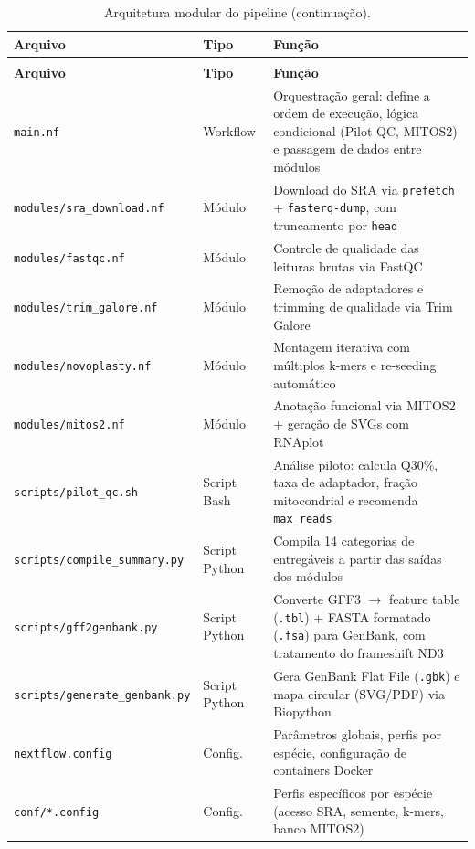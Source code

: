 \begin{longtable}{@{}p{4.5cm}p{2cm}p{7.5cm}@{}}
\caption{Arquitetura modular do pipeline: módulos, scripts e suas responsabilidades.}
\label{tab:modulos} \\
\toprule
\textbf{Arquivo} & \textbf{Tipo} & \textbf{Função} \\
\midrule
\endfirsthead
\caption[]{Arquitetura modular do pipeline (continuação).} \\
\toprule
\textbf{Arquivo} & \textbf{Tipo} & \textbf{Função} \\
\midrule
\endhead
\bottomrule
\endfoot
\texttt{main.nf} & Workflow & Orquestração geral: define a ordem de execução, lógica condicional (Pilot QC, MITOS2) e passagem de dados entre módulos \\
\addlinespace
\texttt{modules/\allowbreak sra\_download.nf} & Módulo & Download do SRA via \texttt{prefetch} + \texttt{fasterq-dump}, com truncamento por \texttt{head} \\
\addlinespace
\texttt{modules/\allowbreak fastqc.nf} & Módulo & Controle de qualidade das leituras brutas via FastQC \\
\addlinespace
\texttt{modules/\allowbreak trim\_galore.nf} & Módulo & Remoção de adaptadores e trimming de qualidade via Trim Galore \\
\addlinespace
\texttt{modules/\allowbreak novoplasty.nf} & Módulo & Montagem iterativa com múltiplos k-mers e re-seeding automático \\
\addlinespace
\texttt{modules/mitos2.nf} & Módulo & Anotação funcional via MITOS2 + geração de SVGs com RNAplot \\
\addlinespace
\texttt{scripts/pilot\_qc.sh} & Script Bash & Análise piloto: calcula Q30\%, taxa de adaptador, fração mitocondrial e recomenda \texttt{max\_reads} \\
\addlinespace
\texttt{scripts/\allowbreak compile\_summary.py} & Script Python & Compila 14 categorias de entregáveis a partir das saídas dos módulos \\
\addlinespace
\texttt{scripts/\allowbreak gff2genbank.py} & Script Python & Converte GFF3 $\rightarrow$ feature table (\texttt{.tbl}) + FASTA formatado (\texttt{.fsa}) para GenBank, com tratamento do frameshift ND3 \\
\addlinespace
\texttt{scripts/\allowbreak generate\_genbank.py} & Script Python & Gera GenBank Flat File (\texttt{.gbk}) e mapa circular (SVG/PDF) via Biopython \\
\addlinespace
\texttt{nextflow.config} & Config. & Parâmetros globais, perfis por espécie, configuração de containers Docker \\
\addlinespace
\texttt{conf/*.config} & Config. & Perfis específicos por espécie (acesso SRA, semente, k-mers, banco MITOS2) \\
\end{longtable}

